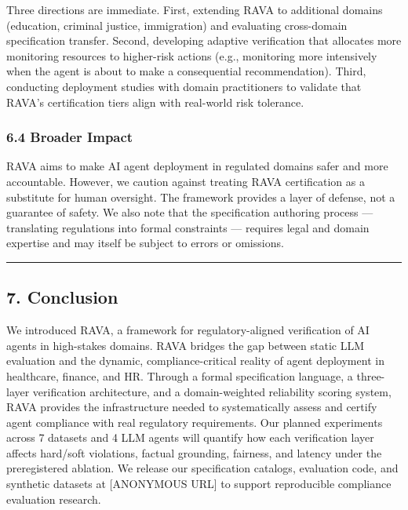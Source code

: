 \documentclass[
]{article}
\begin{document}
Three directions are immediate. First, extending RAVA to additional domains (education, criminal justice, immigration) and evaluating cross-domain specification transfer. Second, developing adaptive verification that allocates more monitoring resources to higher-risk actions (e.g., monitoring more intensively when the agent is about to make a consequential recommendation). Third, conducting deployment studies with domain practitioners to validate that RAVA's certification tiers align with real-world risk tolerance.

\hypertarget{64-broader-impact}{%
\subsubsection{6.4 Broader Impact}\label{64-broader-impact}}

RAVA aims to make AI agent deployment in regulated domains safer and more accountable. However, we caution against treating RAVA certification as a substitute for human oversight. The framework provides a layer of defense, not a guarantee of safety. We also note that the specification authoring process --- translating regulations into formal constraints --- requires legal and domain expertise and may itself be subject to errors or omissions.

\begin{center}\rule{0.5\linewidth}{0.5pt}\end{center}

\hypertarget{7-conclusion}{%
\subsection{7. Conclusion}\label{7-conclusion}}

We introduced RAVA, a framework for regulatory-aligned verification of AI agents in high-stakes domains. RAVA bridges the gap between static LLM evaluation and the dynamic, compliance-critical reality of agent deployment in healthcare, finance, and HR. Through a formal specification language, a three-layer verification architecture, and a domain-weighted reliability scoring system, RAVA provides the infrastructure needed to systematically assess and certify agent compliance with real regulatory requirements. Our planned experiments across 7 datasets and 4 LLM agents will quantify how each verification layer affects hard/soft violations, factual grounding, fairness, and latency under the preregistered ablation. We release our specification catalogs, evaluation code, and synthetic datasets at {[}ANONYMOUS URL{]} to support reproducible compliance evaluation research.
\end{document}
